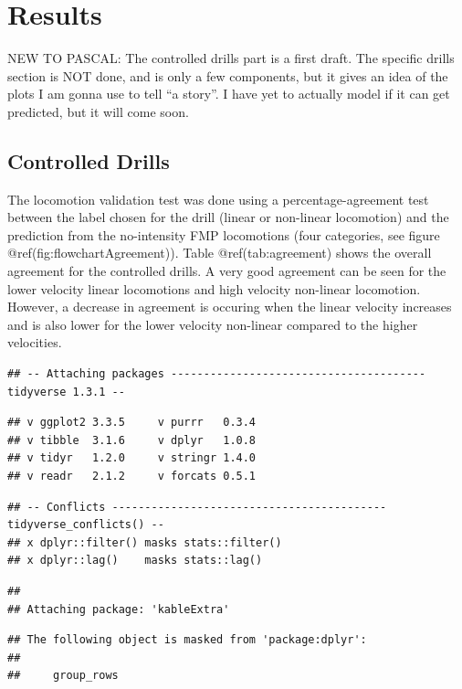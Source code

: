 \documentclass[
]{article}
\author{}
\date{\vspace{-2.5em}}
\begin{document}
\hypertarget{results}{%
\section{Results}\label{results}}

NEW TO PASCAL: The controlled drills part is a first draft. The specific
drills section is NOT done, and is only a few components, but it gives
an idea of the plots I am gonna use to tell ``a story''. I have yet to
actually model if it can get predicted, but it will come soon.

\hypertarget{controlled-drills}{%
\subsection{Controlled Drills}\label{controlled-drills}}

The locomotion validation test was done using a percentage-agreement
test between the label chosen for the drill (linear or non-linear
locomotion) and the prediction from the no-intensity FMP locomotions
(four categories, see figure @ref(fig:flowchartAgreement)). Table
@ref(tab:agreement) shows the overall agreement for the controlled
drills. A very good agreement can be seen for the lower velocity linear
locomotions and high velocity non-linear locomotion. However, a decrease
in agreement is occuring when the linear velocity increases and is also
lower for the lower velocity non-linear compared to the higher
velocities.

\begin{verbatim}
## -- Attaching packages --------------------------------------- tidyverse 1.3.1 --
\end{verbatim}

\begin{verbatim}
## v ggplot2 3.3.5     v purrr   0.3.4
## v tibble  3.1.6     v dplyr   1.0.8
## v tidyr   1.2.0     v stringr 1.4.0
## v readr   2.1.2     v forcats 0.5.1
\end{verbatim}

\begin{verbatim}
## -- Conflicts ------------------------------------------ tidyverse_conflicts() --
## x dplyr::filter() masks stats::filter()
## x dplyr::lag()    masks stats::lag()
\end{verbatim}

\begin{verbatim}
## 
## Attaching package: 'kableExtra'
\end{verbatim}

\begin{verbatim}
## The following object is masked from 'package:dplyr':
## 
##     group_rows
\end{verbatim}
\end{document}

